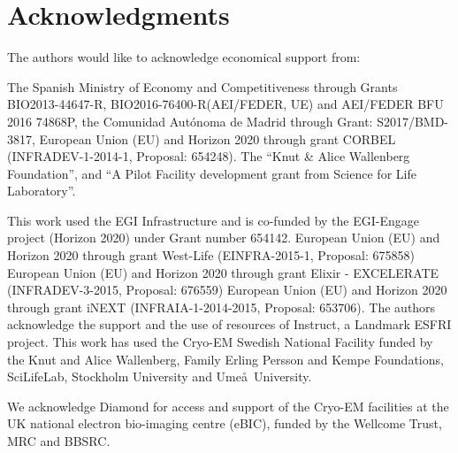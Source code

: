 \section{Acknowledgments}

The authors would like to acknowledge economical support from:

The Spanish Ministry of Economy and Competitiveness through Grants BIO2013-44647-R, BIO2016-76400-R(AEI/FEDER, UE) and AEI/FEDER BFU 2016 74868P, the Comunidad Aut\'{o}noma de Madrid through Grant: S2017/BMD-3817, European Union (EU) and Horizon 2020 through grant CORBEL (INFRADEV-1-2014-1, Proposal: 654248). The ``Knut \& Alice Wallenberg Foundation'', and ``A Pilot Facility development grant from Science for Life Laboratory''. 

This work used the EGI Infrastructure and is co-funded by the EGI-Engage project (Horizon 2020) under Grant number 654142. European Union (EU) and Horizon 2020 through grant West-Life (EINFRA-2015-1, Proposal: 675858) European Union (EU) and Horizon 2020 through grant Elixir - EXCELERATE (INFRADEV-3-2015, Proposal: 676559) European Union (EU) and Horizon 2020 through grant iNEXT (INFRAIA-1-2014-2015, Proposal: 653706). The authors acknowledge the support and the use of resources of Instruct, a Landmark ESFRI project. This work has used the Cryo-EM Swedish National Facility funded by the Knut and Alice Wallenberg, Family Erling Persson and Kempe Foundations, SciLifeLab, Stockholm University and Ume\aa\ University.

We acknowledge Diamond for access and support of the Cryo-EM facilities at the UK national electron bio-imaging centre (eBIC), funded by the Wellcome Trust, MRC and BBSRC.





